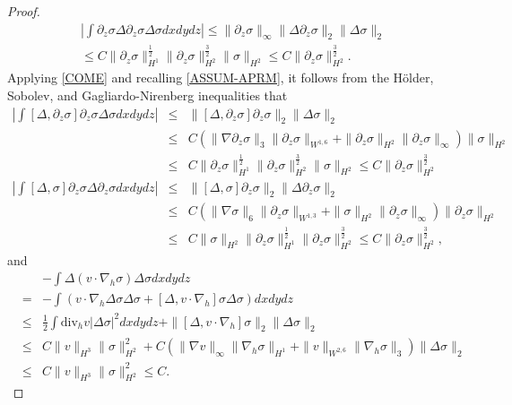 \documentclass[12pt,reqno]{amsart}
\numberwithin{equation}{section}
\begin{document}
\begin{proof}
\begin{eqnarray}
\left|\int\partial_z\sigma\Delta\partial_z\sigma\Delta\sigma dxdydz\right|\leq \|\partial_z\sigma\|_\infty\|\Delta\partial_z\sigma\|_2\|\Delta
\sigma\|_2\nonumber\\
\leq C\|\partial_z\sigma\|_{H^1}^\frac12\|\partial_z\sigma\|_{H^2}^\frac32\|\sigma\|_{H^2}\leq C\|\partial_z\sigma\|_{H^2}^\frac32.\label{EQ26}
\end{eqnarray}
Applying \eqref{COME} and recalling \eqref{ASSUM-APRM}, it follows from the H\"older, Sobolev, and Gagliardo-Nirenberg inequalities that
\begin{eqnarray}
  \left|\int[\Delta,\partial_z\sigma]\partial_z\sigma\Delta\sigma dxdydz\right|
  &\leq&\|[\Delta,\partial_z\sigma]\partial_z\sigma\|_2\|\Delta\sigma\|_2\nonumber\\
  &\leq& C(\|\nabla\partial_z\sigma\|_3\|\partial_z\sigma\|_{W^{1,6}}
  +\|\partial_z\sigma\|_{H^2}\|\partial_z\sigma\|_\infty)\|\sigma\|_{H^2}\nonumber\\
  &\leq& C\|\partial_z\sigma\|_{H^1}^\frac12\|\partial_z\sigma\|_{H^2}^\frac32\|\sigma\|_{H^2}\leq C\|\partial_z\sigma\|_{H^2}^\frac32
  \label{EQ27}\\
  \left|\int[\Delta,\sigma]\partial_z\sigma\Delta\partial_z\sigma dxdydz\right|&\leq&\|[\Delta,\sigma]\partial_z\sigma\|_2\|\Delta\partial_z
  \sigma\|_2\nonumber\\
  &\leq&C(\|\nabla\sigma\|_6\|\partial_z\sigma\|_{W^{1,3}}+\|\sigma\|_{H^2}\|\partial_z\sigma\|_\infty)\|\partial_z\sigma\|_{H^2}\nonumber\\
  &\leq&C\|\sigma\|_{H^2}\|\partial_z\sigma\|_{H^1}^\frac12\|\partial_z\sigma\|_{H^2}^\frac32\leq C\|\partial_z\sigma\|_{H^2}^\frac32,
  \label{EQ28}
\end{eqnarray}
and
\begin{eqnarray}
  &&-\int\Delta(v\cdot\nabla_h\sigma)\Delta\sigma dxdydz\nonumber\\
  &=&-\int(v\cdot\nabla_h\Delta\sigma\Delta\sigma+[\Delta,v\cdot\nabla_h]\sigma\Delta\sigma)dxdydz\nonumber\\
  &\leq&\frac12\int\text{div}_hv|\Delta\sigma|^2dxdydz +\|[\Delta,v\cdot\nabla_h]\sigma\|_2\|\Delta\sigma\|_2\nonumber\\
  &\leq&C\|v\|_{H^3}\|\sigma\|_{H^2}^2+C(\|\nabla v\|_\infty\|\nabla_h\sigma\|_{H^1}+\|v\|_{W^{2,6}}\|\nabla_h\sigma\|_3)
  \|\Delta\sigma\|_2\nonumber\\
  &\leq&C\|v\|_{H^3}\|\sigma\|_{H^2}^2\leq C.\label{EQ29}
\end{eqnarray}

\end{proof}
\end{document}

